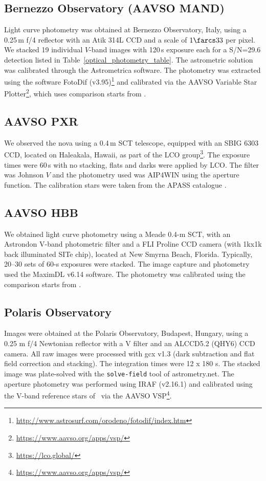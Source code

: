 \documentclass[twocolumn,tighten]{aastex6}
\newcommand{\othreek}{\citetalias{2016ApJ...833..149D}}
\begin{document}
\subsection{Bernezzo Observatory (AAVSO MAND)}

Light curve photometry was obtained at Bernezzo Observatory, Italy, using a 0.25\,m f/4 reflector with an Atik 314L CCD and a scale of $1\farcs33$ per pixel. We stacked 19 individual $V$-band images with 120\,s exposure each for a S/N=29.6 detection listed in Table~\ref{optical_photometry_table}. The astrometric solution was calibrated through the Astrometrica software. The photometry was extracted using the software FotoDif (v3.95)\footnote{\url{http://www.astrosurf.com/orodeno/fotodif/index.htm}} and calibrated via the AAVSO Variable Star Plotter\footnote{\url{https://www.aavso.org/apps/vsp/}}, which uses comparison starts from \othreek.

\subsection{AAVSO PXR}

We observed the nova using a 0.4\,m SCT telescope, equipped with an SBIG 6303 CCD, located on Haleakala, Hawaii, as part of the LCO group\footnote{
\url{https://lco.global/}}. The exposure times were 60\,s with no stacking, flats and darks were applied by LCO.  The filter was Johnson $V$ and the photometry used was AIP4WIN using the aperture function. The calibration stars were taken from the APASS catalogue \citep{2016yCat.2336....0H}.
 

\subsection{AAVSO HBB}

We obtained light curve photometry using a Meade 0.4-m SCT, with an Astrondon V-band photometric filter and a FLI Proline CCD camera (with 1kx1k back illuminated SITe chip), located at New Smyrna Beach, Florida. Typically, 20--30 sets of 60-s exposures were stacked. The image capture and photometry used the MaximDL v6.14 software. The photometry was calibrated using the comparison starts from \othreek.


\subsection{Polaris Observatory}

Images were obtained at the Polaris Observatory, Budapest, Hungary, using a 0.25 m f/4 Newtonian reflector with a V filter and an ALCCD5.2 (QHY6) CCD camera. All raw images were processed with gcx v1.3 (dark subtraction and flat field correction and stacking). The integration times were 12 x 180 s. The stacked image was plate-solved with the \texttt{solve-field} tool of astrometry.net. The aperture photometry was performed using IRAF (v2.16.1) and calibrated using the V-band reference stars of \othreek\ via the AAVSO VSP\footnote{\url{https://www.aavso.org/apps/vsp/}}.
\end{document}
